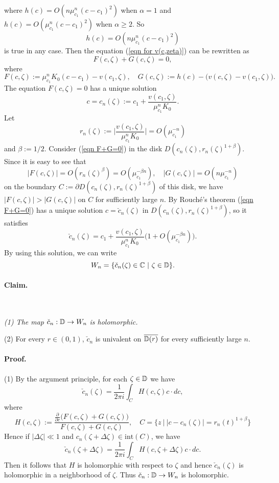 where 
$h(c)=O(n\mu_{c_1}^n(c-c_1)^2)$ when $\alpha=1$ and
$h(c)=O(\mu_{c_1}^n(c-c_1)^2)$ when $\alpha \geq 2$. So 
$$
  h(c)=O(n\mu_{c_1}^n(c-c_1)^2)
$$
is true in any case. 
Then the equation (\ref{eqn for v(c,zeta)}) can be rewritten as
\begin{equation}
F(c,\zeta) + G(c,\zeta) = 0,
\label{eqn F+G=0}
\end{equation}
where
$$
  F(c,\zeta) := \mu_{c_1}^nK_0(c-c_1) - v(c_1,\zeta), \quad
  G(c,\zeta) := h(c) - \big( v(c,\zeta)- v(c_1,\zeta) \big).
$$
The equation $F(c,\zeta)=0$ has a unique solution
$$
  c = c_n(\zeta) := c_1 + \frac{v(c_1,\zeta)}{\mu_{c_1}^nK_0}.
$$
Let
$$
  r_n(\zeta) := \bigg| \frac{v(c_1,\zeta)}{\mu_{c_1}^nK_0} \bigg| 
= O(\mu_{c_1}^{-n})
$$
and $\beta := 1/2$. Consider (\ref{eqn F+G=0}) in the disk 
$D(c_n(\zeta), r_n(\zeta)^{1+\beta})$. Since it is easy to see that
$$
  |F(c,\zeta)| = O(r_n(\zeta)^\beta) = O(\mu_{c_1}^{-\beta n}), \quad 
  |G(c,\zeta)| = O(n\mu_{c_1}^{-n})
$$
on the boundary $C := \partial D(c_n(\zeta), r_n(\zeta)^{1+\beta})$ of this disk, 
we have $|F(c,\zeta)| > |G(c,\zeta)|$ on $C$ for sufficiently large $n$. 
By Rouch\'e's theorem (\ref{eqn F+G=0}) has a unique solution 
$c = \check{c}_n(\zeta)$ in $D(c_n(\zeta), r_n(\zeta)^{1+\beta})$, so it 
satisfies
$$
  \check{c}_n(\zeta) 
= c_1 + \frac{v(c_1,\zeta)}{\mu_{c_1}^nK_0}
\big( 1 + O(\mu_{c_1}^{-\beta n}) \big).
$$
By using this solution, we can write
$$
  W_n = \{ \check{c}_n(\zeta) \in \mathbb C \ | \ \zeta \in \mathbb D \}.
$$

\vskip 2mm

\paragraph{\bf Claim.} \ 
{\it 
{\rm (1)} The map $\check{c}_n : \mathbb D \to W_n$ is holomorphic.

\noindent
{\rm (2)} For every $r \in (0,1)$, $\check{c}_n$ is univalent on 
$\overline{\mathbb D(r)}$ for every sufficiently large $n$.
}

\vskip 2mm


\paragraph{\bf Proof.}
(1) By the argument principle, for each $\zeta \in \mathbb D$ we have
$$
  \check{c}_n(\zeta)
= \frac{1}{2 \pi i}
  \int_C  H(c,\zeta) c \cdot dc, 
$$
where
$$
H(c,\zeta) 
:= 
\frac{\frac{\partial}{\partial c} \big(F(c,\zeta) + G(c,\zeta)\big)}
{F(c,\zeta)+G(c,\zeta)}, \quad
C = \{ z \ | \ |c-c_n(\zeta)|=r_n(t)^{1+\beta} \}
$$
Hence if $|\Delta \zeta| \ll 1$ and $c_n(\zeta+\Delta \zeta) \in \text{int}(C)$,
we have
$$
  \check{c}_n(\zeta+\Delta\zeta)
= \frac{1}{2 \pi i}
  \int_C  H(c,\zeta+\Delta\zeta) c \cdot dc.
$$
Then it follows that $H$ is holomorphic with respect to $\zeta$ and hence
$\check{c}_n(\zeta)$ is holomorphic in a neighborhood of $\zeta$. Thus
$\check{c}_n : \mathbb D \to W_n$ is holomorphic.


